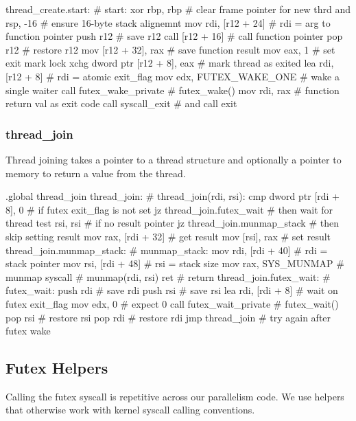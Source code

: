 \begin{asm}
thread_create.start:			    # start:
	xor	rbp, rbp		    #   clear frame pointer for new thrd
	and	rsp, -16		    #   ensure 16-byte stack alignemnt
	mov	rdi, [r12 + 24]		    #   rdi = arg to function pointer
	push	r12			    #   save r12
	call	[r12 + 16]		    #   call function pointer
	pop	r12			    #   restore r12
	mov	[r12 + 32], rax		    #   save function result
	mov	eax, 1			    #   set exit mark
	lock xchg dword ptr [r12 + 8], eax  #   mark thread as exited
	lea	rdi, [r12 + 8]		    #   rdi = atomic exit_flag
	mov	edx, FUTEX_WAKE_ONE	    #   wake a single waiter
	call	futex_wake_private	    #   futex_wake()
	mov	rdi, rax		    #   function return val as exit code
	call	syscall_exit     	    #   and call exit
\end{asm}

\subsubsection{thread\_join}

Thread joining takes a pointer to a thread structure and optionally a pointer
to memory to return a value from the thread.

\begin{asm}
.global thread_join
thread_join:				    # thread_join(rdi, rsi):
	cmp 	dword ptr [rdi + 8], 0      #   if futex exit_flag is not set
	jz	thread_join.futex_wait	    #   then wait for thread
	test	rsi, rsi		    #   if no result pointer
	jz	thread_join.munmap_stack    #   then skip setting result
	mov	rax, [rdi + 32]		    #   get result
	mov	[rsi], rax		    #   set result
thread_join.munmap_stack:		    # munmap_stack:
	mov	rdi, [rdi + 40]		    #   rdi = stack pointer
	mov	rsi, [rdi + 48]		    #   rsi = stack size
	mov	rax, SYS_MUNMAP		    #   munmap
	syscall				    #   munmap(rdi, rsi)
	ret				    #   return
thread_join.futex_wait:			    # futex_wait:
	push	rdi			    #   save rdi
	push	rsi			    #   save rsi
	lea	rdi, [rdi + 8]		    #   wait on futex exit_flag
	mov	edx, 0			    #   expect 0
	call	futex_wait_private	    #   futex_wait()
	pop	rsi			    #   restore rsi
	pop	rdi			    #   restore rdi
	jmp	thread_join		    #   try again after futex wake
\end{asm}

\subsection{Futex Helpers}

Calling the futex syscall is repetitive across our parallelism code. We use
helpers that otherwise work with kernel syscall calling conventions.

